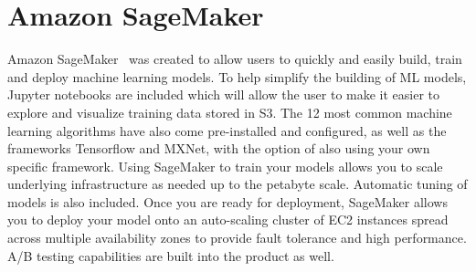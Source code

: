 \section{Amazon SageMaker}
Amazon SageMaker~\cite{hid-sp18-521-Sagemaker} was created to allow users 
to quickly and easily build, train and deploy machine learning models. 
To help simplify the building of ML models, Jupyter notebooks are included
which will allow the user to make it easier to explore and visualize 
training data stored in S3. The 12 most common machine learning algorithms
have also come pre-installed and configured, as well as the frameworks 
Tensorflow and MXNet, with the option of also using your own specific 
framework. Using SageMaker to train your models allows you to scale 
underlying infrastructure as needed up to the petabyte scale. Automatic 
tuning of models is also included. Once you are ready for deployment, 
SageMaker allows you to deploy your model onto an auto-scaling cluster 
of EC2 instances spread across multiple availability zones to provide 
fault tolerance and high performance. A/B testing capabilities are built
into the product as well. 

